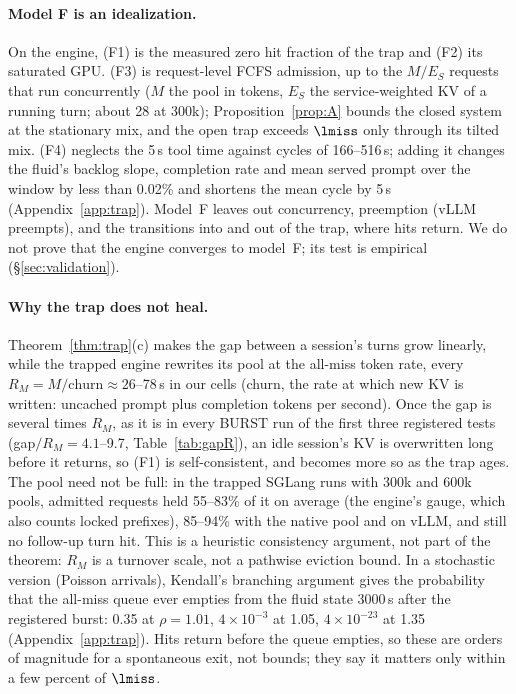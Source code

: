 \paragraph{Model F is an idealization.} On the engine, (F1) is the measured zero hit fraction of the trap and (F2) its saturated
GPU. (F3) is request-level FCFS admission, up to the $M/E_S$ requests that run concurrently ($M$ the pool in tokens, $E_S$ the
service-weighted KV of a running turn; about 28 at 300k); Proposition~\ref{prop:A} bounds the closed system at the stationary mix,
and the open trap exceeds $\lmiss$ only through its tilted mix. (F4) neglects the 5\,s tool time against cycles of 166--516\,s; adding it changes the fluid's backlog slope,
completion rate and mean served prompt over the window by less than 0.02\% and shortens the mean cycle by
5\,s (Appendix~\ref{app:trap}). Model~F leaves out concurrency, preemption (vLLM preempts), and
the transitions into and out of the trap, where hits return. We do not prove that the engine converges to model~F; its test
is empirical (\S\ref{sec:validation}).

\paragraph{Why the trap does not heal.} Theorem~\ref{thm:trap}(c) makes the gap between a session's turns grow linearly, while
the trapped engine rewrites its pool at the all-miss token rate, every $R_M=M/\text{churn}\approx26$--78\,s in our cells (churn, the rate at which new KV is written: uncached prompt plus
completion tokens per second).
Once the gap is several times $R_M$, as it is in every BURST run of the first three registered tests (gap$/R_M=4.1$--9.7,
Table~\ref{tab:gapR}), an idle
session's KV is overwritten long before it returns, so (F1) is self-consistent, and becomes more so as the trap ages. The pool
need not be full: in the trapped SGLang runs with 300k and 600k pools, admitted requests held 55--83\% of it on average (the
engine's gauge, which also counts locked prefixes), 85--94\% with the native pool and on vLLM, and still no follow-up turn hit.
This is a heuristic consistency argument, not part of the theorem: $R_M$ is a turnover scale, not a pathwise eviction bound. In a
stochastic version (Poisson arrivals), Kendall's branching argument gives the probability that the all-miss queue ever
empties from the fluid state 3000\,s after the registered burst: 0.35 at $\rho=1.01$, $4\times10^{-3}$ at 1.05,
$4\times10^{-23}$ at 1.35 (Appendix~\ref{app:trap}). Hits return before the queue empties, so these are orders of magnitude for a
spontaneous exit, not bounds; they say it matters only within a few percent of $\lmiss$.
